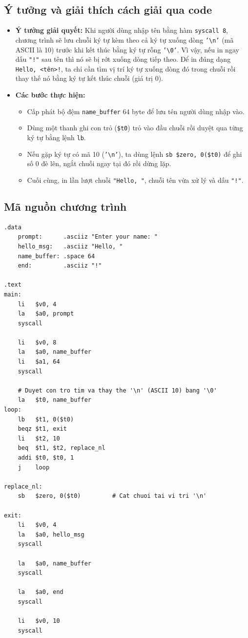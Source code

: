 \documentclass[a4paper]{article}
\numberwithin{figure}{section}
\numberwithin{table}{section}
\begin{document}
\subsection{Ý tưởng và giải thích cách giải qua code}
\begin{itemize}[leftmargin=*]
    \item \textbf{Ý tưởng giải quyết:}
    Khi người dùng nhập tên bằng hàm \texttt{syscall 8}, chương trình sẽ lưu chuỗi ký tự kèm theo cả ký tự xuống dòng \texttt{'\textbackslash n'} (mã ASCII là 10) trước khi kết thúc bằng ký tự rỗng \texttt{'\textbackslash 0'}. Vì vậy, nếu in ngay dấu \texttt{"!"} sau tên thì nó sẽ bị rớt xuống dòng tiếp theo. Để in đúng dạng \texttt{Hello, <tên>!}, ta chỉ cần tìm vị trí ký tự xuống dòng đó trong chuỗi rồi thay thế nó bằng ký tự kết thúc chuỗi (giá trị 0).
    
    \item \textbf{Các bước thực hiện:}
    \begin{itemize}[leftmargin=*]
        \item Cấp phát bộ đệm \texttt{name\_buffer} 64 byte để lưu tên người dùng nhập vào.
        \item Dùng một thanh ghi con trỏ (\texttt{\$t0}) trỏ vào đầu chuỗi rồi duyệt qua từng ký tự bằng lệnh \texttt{lb}.
        \item Nếu gặp ký tự có mã 10 (\texttt{'\textbackslash n'}), ta dùng lệnh \texttt{sb \$zero, 0(\$t0)} để ghi số 0 đè lên, ngắt chuỗi ngay tại đó rồi dừng lặp.
        \item Cuối cùng, in lần lượt chuỗi \texttt{"Hello, "}, chuỗi tên vừa xử lý và dấu \texttt{"!"}.
    \end{itemize}
\end{itemize}

\subsection{Mã nguồn chương trình}
\begin{lstlisting}[style=mipsstyle]
.data
    prompt:      .asciiz "Enter your name: "
    hello_msg:   .asciiz "Hello, "
    name_buffer: .space 64
    end:         .asciiz "!"
    
.text
main:
    li   $v0, 4
    la   $a0, prompt
    syscall
    
    li   $v0, 8
    la   $a0, name_buffer
    li   $a1, 64
    syscall
    
    # Duyet con tro tim va thay the '\n' (ASCII 10) bang '\0'
    la   $t0, name_buffer
loop:
    lb   $t1, 0($t0)
    beqz $t1, exit
    li   $t2, 10
    beq  $t1, $t2, replace_nl
    addi $t0, $t0, 1
    j    loop

replace_nl:
    sb   $zero, 0($t0)         # Cat chuoi tai vi tri '\n'

exit:
    li   $v0, 4
    la   $a0, hello_msg
    syscall
    
    la   $a0, name_buffer
    syscall
    
    la   $a0, end
    syscall
    
    li   $v0, 10
    syscall
\end{lstlisting}
\end{document}
